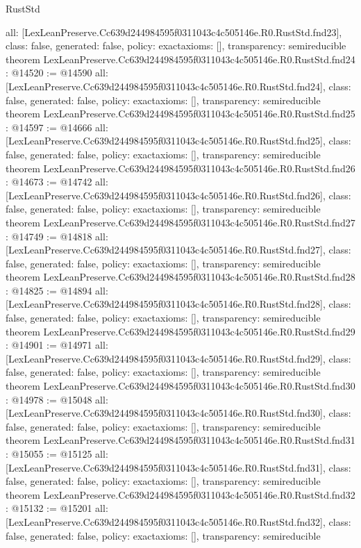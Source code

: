 \begin{lexlean}{RustStd}
\begin{coremodule}
{  all: [LexLeanPreserve.Cc639d244984595f0311043c4c505146e.R0.RustStd.fnd23],
  class: false,
  generated: false,
  policy: exact{axioms: []},
  transparency: semireducible
}
theorem LexLeanPreserve.Cc639d244984595f0311043c4c505146e.R0.RustStd.fnd24 : @14520 := @14590 {
  all: [LexLeanPreserve.Cc639d244984595f0311043c4c505146e.R0.RustStd.fnd24],
  class: false,
  generated: false,
  policy: exact{axioms: []},
  transparency: semireducible
}
theorem LexLeanPreserve.Cc639d244984595f0311043c4c505146e.R0.RustStd.fnd25 : @14597 := @14666 {
  all: [LexLeanPreserve.Cc639d244984595f0311043c4c505146e.R0.RustStd.fnd25],
  class: false,
  generated: false,
  policy: exact{axioms: []},
  transparency: semireducible
}
theorem LexLeanPreserve.Cc639d244984595f0311043c4c505146e.R0.RustStd.fnd26 : @14673 := @14742 {
  all: [LexLeanPreserve.Cc639d244984595f0311043c4c505146e.R0.RustStd.fnd26],
  class: false,
  generated: false,
  policy: exact{axioms: []},
  transparency: semireducible
}
theorem LexLeanPreserve.Cc639d244984595f0311043c4c505146e.R0.RustStd.fnd27 : @14749 := @14818 {
  all: [LexLeanPreserve.Cc639d244984595f0311043c4c505146e.R0.RustStd.fnd27],
  class: false,
  generated: false,
  policy: exact{axioms: []},
  transparency: semireducible
}
theorem LexLeanPreserve.Cc639d244984595f0311043c4c505146e.R0.RustStd.fnd28 : @14825 := @14894 {
  all: [LexLeanPreserve.Cc639d244984595f0311043c4c505146e.R0.RustStd.fnd28],
  class: false,
  generated: false,
  policy: exact{axioms: []},
  transparency: semireducible
}
theorem LexLeanPreserve.Cc639d244984595f0311043c4c505146e.R0.RustStd.fnd29 : @14901 := @14971 {
  all: [LexLeanPreserve.Cc639d244984595f0311043c4c505146e.R0.RustStd.fnd29],
  class: false,
  generated: false,
  policy: exact{axioms: []},
  transparency: semireducible
}
theorem LexLeanPreserve.Cc639d244984595f0311043c4c505146e.R0.RustStd.fnd30 : @14978 := @15048 {
  all: [LexLeanPreserve.Cc639d244984595f0311043c4c505146e.R0.RustStd.fnd30],
  class: false,
  generated: false,
  policy: exact{axioms: []},
  transparency: semireducible
}
theorem LexLeanPreserve.Cc639d244984595f0311043c4c505146e.R0.RustStd.fnd31 : @15055 := @15125 {
  all: [LexLeanPreserve.Cc639d244984595f0311043c4c505146e.R0.RustStd.fnd31],
  class: false,
  generated: false,
  policy: exact{axioms: []},
  transparency: semireducible
}
theorem LexLeanPreserve.Cc639d244984595f0311043c4c505146e.R0.RustStd.fnd32 : @15132 := @15201 {
  all: [LexLeanPreserve.Cc639d244984595f0311043c4c505146e.R0.RustStd.fnd32],
  class: false,
  generated: false,
  policy: exact{axioms: []},
  transparency: semireducible
}
\end{coremodule}
\end{lexlean}
